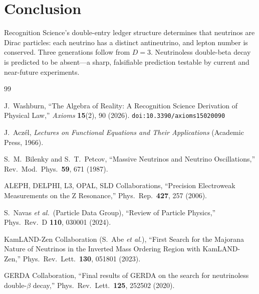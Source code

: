 \documentclass[12pt,a4paper]{article}
\theoremstyle{definition}
\theoremstyle{remark}
\begin{document}
\section{Conclusion}
\label{sec:conclusion}

Recognition Science's double-entry ledger structure determines
that neutrinos are Dirac particles: each neutrino has a distinct
antineutrino, and lepton number is conserved.  Three generations
follow from $D = 3$.  Neutrinoless double-beta decay is predicted
to be absent---a sharp, falsifiable prediction testable by
current and near-future experiments.

\begin{thebibliography}{99}

J.~Washburn, ``The Algebra of Reality: A Recognition Science Derivation
of Physical Law,'' \emph{Axioms} \textbf{15}(2), 90 (2026).
\texttt{doi:10.3390/axioms15020090}

J.~Acz\'el, \emph{Lectures on Functional Equations and Their
Applications} (Academic Press, 1966).

S.~M.~Bilenky and S.~T.~Petcov, ``Massive Neutrinos and
Neutrino Oscillations,'' Rev.\ Mod.\ Phys.\ \textbf{59}, 671
(1987).

ALEPH, DELPHI, L3, OPAL, SLD Collaborations, ``Precision
Electroweak Measurements on the Z Resonance,'' Phys.\ Rep.\
\textbf{427}, 257 (2006).

S.~Navas \textit{et al.}\ (Particle Data Group), ``Review of Particle
Physics,'' Phys.\ Rev.\ D \textbf{110}, 030001 (2024).

KamLAND-Zen Collaboration (S.~Abe \textit{et al.}),
``First Search for the Majorana Nature of Neutrinos in the
Inverted Mass Ordering Region with KamLAND-Zen,''
Phys.\ Rev.\ Lett.\ \textbf{130}, 051801 (2023).

GERDA Collaboration, ``Final results of GERDA on the search for
neutrinoless double-$\beta$ decay,'' Phys.\ Rev.\ Lett.\
\textbf{125}, 252502 (2020).

\end{thebibliography}
\end{document}
